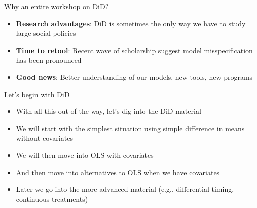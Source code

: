 \documentclass{beamer}
\begin{document}
\begin{frame}{Why an entire workshop on DiD?}

\begin{itemize}
\item \textbf{Research advantages}: DiD is sometimes the only way we have to study large social policies 
\item \textbf{Time to retool}: Recent wave of scholarship suggest model misspecification has been pronounced
\item \textbf{Good news}: Better understanding of our models, new tools, new programs
\end{itemize}

\end{frame}







\begin{frame}{Let's begin with DiD}

\begin{itemize}
\item With all this out of the way, let's dig into the DiD material
\item We will start with the simplest situation using simple difference in means without covariates
\item We will then move into OLS with covariates
\item And then move into alternatives to OLS when we have covariates
\item Later we go into the more advanced material (e.g., differential timing, continuous treatments)
\end{itemize}

\end{frame}
\end{document}
